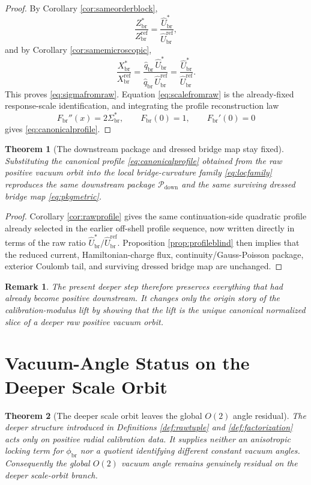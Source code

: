 \documentclass[11pt]{article}
\newcommand{\CurvProfile}{F_{\mathrm{br}}}
\newcommand{\DownPkg}{\mathscr P_{\mathrm{down}}}
\newcommand{\RespSusEq}{\Sigma_{\mathrm{br}}^{\ast}}
\newcommand{\RespMicroRef}{X_{\mathrm{br}}^{\mathrm{ref}}}
\newcommand{\RespMicroEq}{X_{\mathrm{br}}^{\ast}}
\newcommand{\RespOrderRef}{Z_{\mathrm{br}}^{\mathrm{ref}}}
\newcommand{\RespOrderEq}{Z_{\mathrm{br}}^{\ast}}
\newcommand{\RespVacPhase}{\phi_{\mathrm{br}}}
\newcommand{\RespRawReadout}{\widehat q_{\mathrm{br}}}
\newcommand{\RespRawRef}{\widehat U_{\mathrm{br}}^{\mathrm{ref}}}
\newcommand{\RespRawEq}{\widehat U_{\mathrm{br}}^{\ast}}
\newtheorem{remark}{Remark}
\newtheorem{theorem}{Theorem}
\begin{document}
\begin{proof}
By Corollary \ref{cor:sameorderblock},
\[
\frac{\RespOrderEq}{\RespOrderRef}=\frac{\RespRawEq}{\RespRawRef},
\]
and by Corollary \ref{cor:samemicroscopic},
\[
\frac{\RespMicroEq}{\RespMicroRef}
=
\frac{\RespRawReadout\,\RespRawEq}{\RespRawReadout\,\RespRawRef}
=
\frac{\RespRawEq}{\RespRawRef}.
\]
This proves \eqref{eq:sigmafromraw}. Equation \eqref{eq:scalefromraw} is the already-fixed response-scale identification, and integrating the profile reconstruction law
\[
\CurvProfile''(x)=2\RespSusEq,
\qquad
\CurvProfile(0)=1,
\qquad
\CurvProfile'(0)=0
\]
gives \eqref{eq:canonicalprofile}.
\end{proof}

\begin{theorem}[The downstream package and dressed bridge map stay fixed]
\label{thm:rawfixedpackage}
Substituting the canonical profile \eqref{eq:canonicalprofile} obtained from the raw positive vacuum orbit into the local bridge-curvature family \eqref{eq:locfamily} reproduces the same downstream package \(\DownPkg\) and the same surviving dressed bridge map \eqref{eq:pkgmetric}.
\end{theorem}

\begin{proof}
Corollary \ref{cor:rawprofile} gives the same continuation-side quadratic profile already selected in the earlier off-shell profile sequence, now written directly in terms of the raw ratio \(\RespRawEq/\RespRawRef\). Proposition \ref{prop:profileblind} then implies that the reduced current, Hamiltonian-charge flux, continuity/Gauss-Poisson package, exterior Coulomb tail, and surviving dressed bridge map are unchanged.
\end{proof}

\begin{remark}
The present deeper step therefore preserves everything that had already become positive downstream. It changes only the origin story of the calibration-modulus lift by showing that the lift is the unique canonical normalized slice of a deeper raw positive vacuum orbit.
\end{remark}

\section{Vacuum-Angle Status on the Deeper Scale Orbit}

\begin{theorem}[The deeper scale orbit leaves the global \(O(2)\) angle residual]
\label{thm:angleresidual}
The deeper structure introduced in Definitions \ref{def:rawtuple} and \ref{def:factorization} acts only on positive radial calibration data. It supplies neither an anisotropic locking term for \(\RespVacPhase\) nor a quotient identifying different constant vacuum angles. Consequently the global \(O(2)\) vacuum angle remains genuinely residual on the deeper scale-orbit branch.
\end{theorem}
\end{document}
